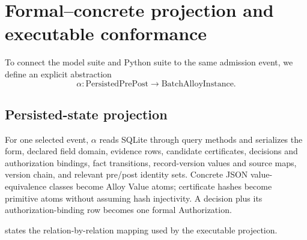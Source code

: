 \section{Formal--concrete projection and executable conformance}
\label{sec:conformance}

To connect the model suite and Python suite to the same admission event, we define an explicit abstraction
\begin{equation}
\alpha:\mathrm{PersistedPrePost}\rightarrow\mathrm{BatchAlloyInstance}.
\end{equation}

\subsection{Persisted-state projection}

For one selected event, $\alpha$ reads SQLite through query methods and serializes the form, declared field domain, evidence rows, candidate certificates, decisions and authorization bindings, fact transitions, record-version values and source maps, version chain, and relevant pre/post identity sets. Concrete JSON value-equivalence classes become Alloy Value atoms; certificate hashes become primitive  atoms without assuming hash injectivity. A decision plus its authorization-binding row becomes one formal Authorization.

 states the relation-by-relation mapping used by the executable projection.

